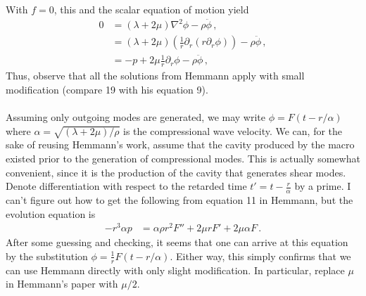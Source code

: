 \documentclass{article}
\newcommand*\p[1]{\left(#1\right)}
\newcommand*\f[2]{\frac{#1}{#2}}
\begin{document}
With $f=0$, this and the scalar equation of motion yield
\begin{align}
0&=(\lambda+2\mu)\nabla^2\phi-\rho\ddot\phi\,,\\
&=(\lambda+2\mu)\p{\f1r\partial_r\p{r\partial_r\phi}}-\rho\ddot\phi\,,\\
&=-p+2\mu\f1r\partial_r\phi-\rho\ddot\phi\,,
\end{align}
Thus, observe that all the solutions from Hemmann apply with small modification (compare 19 with his equation 9).
\\\\
Assuming only outgoing modes are generated, we may write $\phi=F(t-r/\alpha)$ where $\alpha=\sqrt{(\lambda+2\mu)/\rho}$ is the compressional wave velocity. We can, for the sake of reusing Hemmann's work, assume that the cavity produced by the macro existed prior to the generation of compressional modes. This is actually somewhat convenient, since it is the production of the cavity that generates shear modes. Denote differentiation with respect to the retarded time $t'=t-\f r\alpha$ by a prime. I can't figure out how to get the following from equation 11 in Hemmann, but the evolution equation is
\begin{align}
-r^3\alpha p&=\alpha\rho r^2 F''+2\mu r F'+2\mu\alpha F\,.
\end{align}
After some guessing and checking, it seems that one can arrive at this equation by the substitution $\phi=\f1rF(t-r/\alpha)$. Either way, this simply confirms that we can use Hemmann directly with only slight modification. In particular, replace $\mu$ in Hemmann's paper with $\mu/2$.
\end{document}
